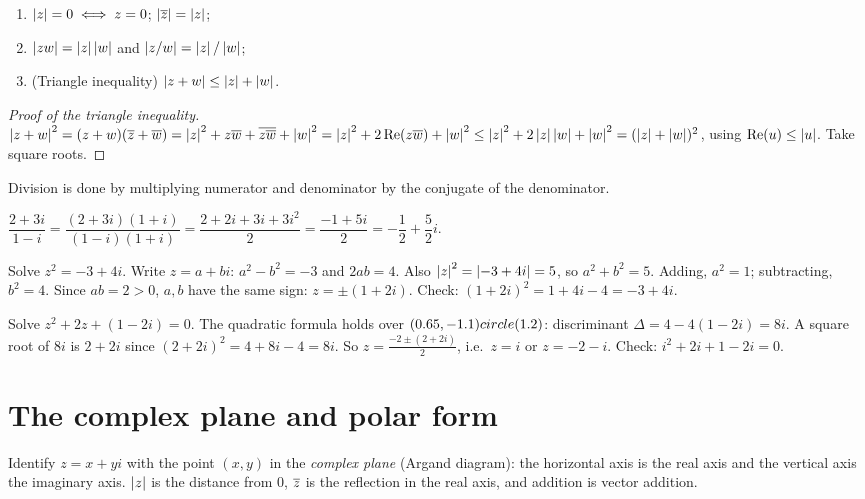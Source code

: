\begin{proposition}
\begin{enumerate}
  \item $\left\lvert z \right\rvert = 0 \iff z = 0$; $\left\lvert \overline{z} \right\rvert = \left\lvert z \right\rvert$;
  \item $\left\lvert zw \right\rvert = \left\lvert z \right\rvert\left\lvert w \right\rvert$ and $\left\lvert z/w \right\rvert = \left\lvert z \right\rvert/\left\lvert w \right\rvert$;
  \item (Triangle inequality) $\left\lvert z + w \right\rvert \le \left\lvert z \right\rvert + \left\lvert w \right\rvert$.
\end{enumerate}
\end{proposition}
\begin{proof}[Proof of the triangle inequality]
$\left\lvert z+w \right\rvert^2 = (z+w)(\overline{z} + \overline{w}) = \left\lvert z \right\rvert^2 + z\overline{w} + \overline{z\overline{w}} + \left\lvert w \right\rvert^2
= \left\lvert z \right\rvert^2 + 2\operatorname{Re}(z\overline{w}) + \left\lvert w \right\rvert^2 \le \left\lvert z \right\rvert^2 + 2\left\lvert z \right\rvert\left\lvert w \right\rvert + \left\lvert w \right\rvert^2 =
(\left\lvert z \right\rvert + \left\lvert w \right\rvert)^2$, using $\operatorname{Re}(u) \le \left\lvert u \right\rvert$. Take square roots.
\end{proof}

Division is done by multiplying numerator and denominator by the conjugate of the denominator.

\begin{example}
$\dfrac{2 + 3i}{1 - i} = \dfrac{(2+3i)(1+i)}{(1-i)(1+i)} = \dfrac{2 + 2i + 3i + 3i^2}{2}
= \dfrac{-1 + 5i}{2} = -\dfrac12 + \dfrac52 i$.
\end{example}

\begin{example}
Solve $z^2 = -3 + 4i$. Write $z = a + bi$: $a^2 - b^2 = -3$ and $2ab = 4$. Also
$\left\lvert z \right\rvert^2 = \left\lvert -3+4i \right\rvert = 5$, so $a^2 + b^2 = 5$. Adding, $a^2 = 1$; subtracting, $b^2 = 4$. Since
$ab = 2 > 0$, $a,b$ have the same sign: $z = \pm(1 + 2i)$. Check: $(1+2i)^2 = 1 + 4i - 4 = -3+4i$.
\end{example}

\begin{example}
Solve $z^2 + 2z + (1 - 2i) = 0$. The quadratic formula holds over $(0.65,-1.1) circle (1.2)$:
discriminant $\Delta = 4 - 4(1 - 2i) = 8i$. A square root of $8i$ is $2 + 2i$ since
$(2+2i)^2 = 4 + 8i - 4 = 8i$. So $z = \frac{-2 \pm (2 + 2i)}{2}$, i.e.\ $z = i$ or $z = -2 - i$.
Check: $i^2 + 2i + 1 - 2i = 0$.
\end{example}

\section{The complex plane and polar form}

Identify $z = x + yi$ with the point $(x,y)$ in the \emph{complex plane} (Argand diagram):
the horizontal axis is the real axis and the vertical axis the imaginary axis. $\left\lvert z \right\rvert$ is the
distance from $0$, $\overline{z}$ is the reflection in the real axis, and addition is vector
addition.

